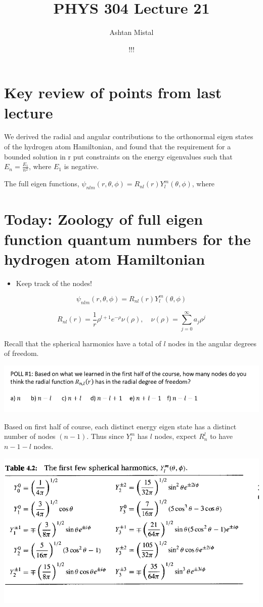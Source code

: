 \documentclass{article}
\title{PHYS 304 Lecture 21}
\author{Ashtan Mistal}
\date{!!!}
\begin{document}
\ifstandalone
\maketitle
\fi

\graphicspath{{./Lecture21/}}

\section{Key review of points from last lecture}

We derived the radial and angular contributions to the orthonormal eigen states of the hydrogen atom Hamiltonian, and found that the requirement for a bounded solution in r put constraints on the energy eigenvalues such that $E_n = \frac{E_1}{n^2}$, where $E_1$ is negative. 

The full eigen functions, $\psi_{nlm}(r, \theta, \phi) = R_{nl}(r) Y_l^m(\theta,\phi)$, where


\section{Today: Zoology of full eigen function quantum numbers for the hydrogen atom Hamiltonian}


\begin{itemize}
    \item Keep track of the nodes!
\end{itemize}
    $$\psi_{nlm}(r, \theta, \phi) = R_{nl}(r) Y_l^m(\theta,\phi)$$
    
    $$R_{nl}(r) = \frac{1}{r} \rho^{l+1} e^{-\rho} \nu(\rho), \quad \nu(\rho) = \sum_{j=0}^\infty a_j \rho^j$$
    
    Recall that the spherical harmonics have a total of $l$ nodes in the angular degrees of freedom.
    
    \includegraphics[width = 0.8 \textwidth]{Lecture21/1.png}
    
    Based on first half of course, each distinct energy eigen state has a distinct number of nodes $(n-1)$.  Thus since $Y_l^m$ has $l$ nodes, expect $R_n^l$ to have $n-1-l$ nodes.
    
    \includegraphics[width = 0.7 \textwidth]{Lecture21/2.png}
    
\end{document}
